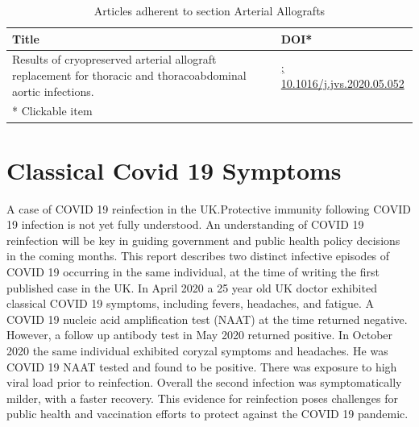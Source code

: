 \documentclass{qqtarticle}
\begin{document}
    \begin{table}[H]
    \scriptsize
    \centering
    \caption{Articles adherent to section Arterial Allografts}
    \renewcommand{\arraystretch}{1.5}
    \begin{tabular}{p{}l}
        \toprule 
        Title & DOI* \\     \midrule Results of cryopreserved arterial allograft replacement for thoracic and thoracoabdominal aortic infections. \cite{Resultsof79533396} & \href{https://dx.doi.org/; 10.1016/j.jvs.2020.05.052}{; 10.1016/j.jvs.2020.05.052}\\     \midrule
        * Clickable item \\
        \bottomrule
    \end{tabular}
    \label{tab:topic1}
    \end{table}\section{Classical Covid 19 Symptoms}
        A case of COVID 19 reinfection in the UK.Protective immunity following COVID 19 infection is not yet fully understood. An understanding of COVID 19 reinfection will be key in guiding government and public health policy decisions in the coming months. This report describes two distinct infective episodes of COVID 19 occurring in the same individual, at the time of writing the first published case in the UK. In April 2020 a 25 year old UK doctor exhibited classical COVID 19 symptoms, including fevers, headaches, and fatigue. A COVID 19 nucleic acid amplification test (NAAT) at the time returned negative. However, a follow up antibody test in May 2020 returned positive. In October 2020 the same individual exhibited coryzal symptoms and headaches. He was COVID 19 NAAT tested and found to be positive. There was exposure to high viral load prior to reinfection. Overall the second infection was symptomatically milder, with a faster recovery. This evidence for reinfection poses challenges for public health and vaccination efforts to protect against the COVID 19 pandemic.
\end{document}
